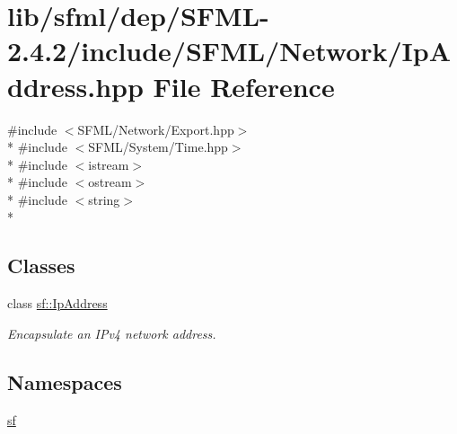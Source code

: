 \hypertarget{sfml_2dep_2_s_f_m_l-2_84_82_2include_2_s_f_m_l_2_network_2_ip_address_8hpp}{\section{lib/sfml/dep/\-S\-F\-M\-L-\/2.4.2/include/\-S\-F\-M\-L/\-Network/\-Ip\-Address.hpp File Reference}
\label{sfml_2dep_2_s_f_m_l-2_84_82_2include_2_s_f_m_l_2_network_2_ip_address_8hpp}
}
{\ttfamily \#include $<$S\-F\-M\-L/\-Network/\-Export.\-hpp$>$}\\*
{\ttfamily \#include $<$S\-F\-M\-L/\-System/\-Time.\-hpp$>$}\\*
{\ttfamily \#include $<$istream$>$}\\*
{\ttfamily \#include $<$ostream$>$}\\*
{\ttfamily \#include $<$string$>$}\\*
\subsection*{Classes}
\begin{DoxyCompactItemize}
\item 
class \hyperlink{classsf_1_1_ip_address}{sf\-::\-Ip\-Address}
\begin{DoxyCompactList}\small\item\em Encapsulate an I\-Pv4 network address. \end{DoxyCompactList}\end{DoxyCompactItemize}
\subsection*{Namespaces}
\begin{DoxyCompactItemize}
\item 
\hyperlink{namespacesf}{sf}
\end{DoxyCompactItemize}
